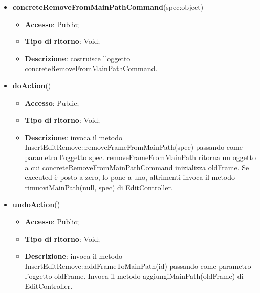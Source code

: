 {{{\begin{itemize}
					\item \textbf{concreteRemoveFromMainPathCommand}(spec:object)
					\begin{itemize}
						\item \textbf{Accesso}: Public;
						\item \textbf{Tipo di ritorno}: Void;
						\item \textbf{Descrizione}: costruisce l’oggetto concreteRemoveFromMainPathCommand.
					\end{itemize}
					\item \textbf{doAction}()
					\begin{itemize}
						\item \textbf{Accesso}: Public;
						\item \textbf{Tipo di ritorno}: Void;
						\item \textbf{Descrizione}: invoca il metodo InsertEditRemove::removeFrameFromMainPath(spec) passando come parametro l'oggetto spec.  removeFrameFromMainPath ritorna un oggetto a cui concreteRemoveFromMainPathCommand inizializza oldFrame. Se executed è posto a zero, lo pone a uno, altrimenti invoca il metodo rimuoviMainPath(null, spec) di EditController.
					\end{itemize}
					\item \textbf{undoAction}()
					\begin{itemize}
						\item \textbf{Accesso}: Public;
						\item \textbf{Tipo di ritorno}: Void;
						\item \textbf{Descrizione}: invoca il metodo InsertEditRemove::addFrameToMainPath(id) passando come parametro l'oggetto oldFrame. Invoca il metodo aggiungiMainPath(oldFrame) di EditController.
					\end{itemize}
				\end{itemize}
				}

}}
